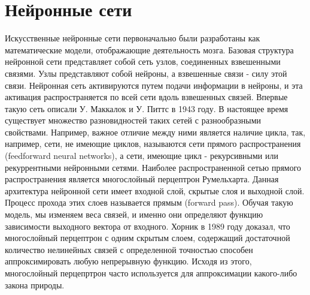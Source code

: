 \section{Нейронные сети}\label{ner_network}
    Искусственные нейронные сети первоначально были разработаны как математические модели, отображающие деятельность мозга. Базовая структура нейронной сети представляет собой сеть узлов, соединенных взвешенными связями. Узлы представляют собой нейроны, а взвешенные связи - силу этой связи. Нейронная сеть активируются путем подачи информации в нейроны, и эта активация распространяется по всей сети вдоль взвешенных связей. Впервые такую сеть описали У. Маккалок и У. Питтс в 1943 году. В настоящее время существует множество разновидностей таких сетей с разнообразными свойствами. Например, важное отличие между ними является наличие цикла, так, например, сети, не имеющие циклов, называются сети прямого распространения (feedforward neural networks), а сети, имеющие цикл - рекурсивными или рекуррентными нейронными сетями. Наиболее распространенной сетью прямого распространения является многослойный перцептрон Румельхарта. Данная архитектура нейронной сети имеет входной слой, скрытые слоя и выходной слой. Процесс прохода этих слоев называется прямым (forward pass). Обучая такую модель, мы изменяем веса связей, и именно они определяют функцию зависимости выходного вектора от входного. Хорник в 1989 году доказал, что многослойный перцептрон с одним скрытым слоем, содержащий достаточной количество нелинейных связей с определенной точностью способен аппроксимировать любую непрерывную функцию. Исходя из этого, многослойный перцепртрон часто используется для аппроксимации какого-либо закона природы.
    
